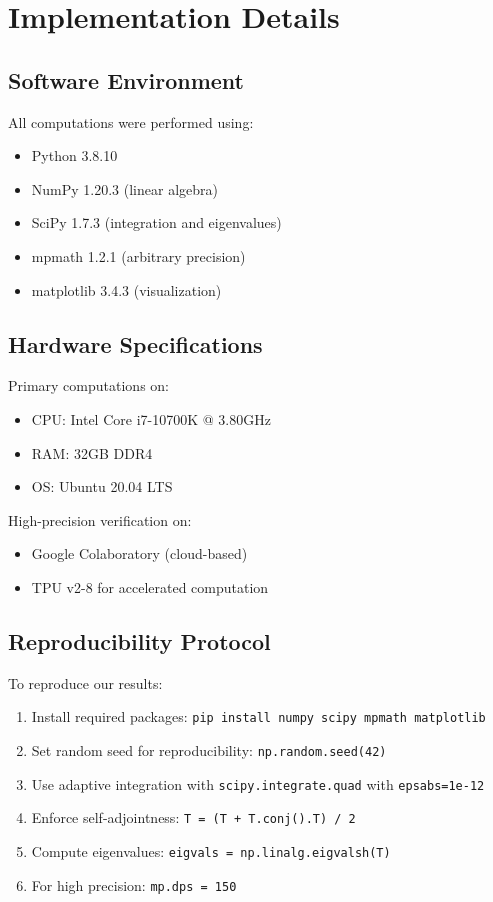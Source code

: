 \documentclass[12pt,letterpaper]{article}
\theoremstyle{plain}
\theoremstyle{definition}
\theoremstyle{remark}
\begin{document}
\section{Implementation Details}

\subsection{Software Environment}

All computations were performed using:
\begin{itemize}
\item Python 3.8.10
\item NumPy 1.20.3 (linear algebra)
\item SciPy 1.7.3 (integration and eigenvalues)
\item mpmath 1.2.1 (arbitrary precision)
\item matplotlib 3.4.3 (visualization)
\end{itemize}

\subsection{Hardware Specifications}

Primary computations on:
\begin{itemize}
\item CPU: Intel Core i7-10700K @ 3.80GHz
\item RAM: 32GB DDR4
\item OS: Ubuntu 20.04 LTS
\end{itemize}

High-precision verification on:
\begin{itemize}
\item Google Colaboratory (cloud-based)
\item TPU v2-8 for accelerated computation
\end{itemize}

\subsection{Reproducibility Protocol}

To reproduce our results:

\begin{enumerate}
\item Install required packages: \texttt{pip install numpy scipy mpmath matplotlib}
\item Set random seed for reproducibility: \texttt{np.random.seed(42)}
\item Use adaptive integration with \texttt{scipy.integrate.quad} with \texttt{epsabs=1e-12}
\item Enforce self-adjointness: \texttt{T = (T + T.conj().T) / 2}
\item Compute eigenvalues: \texttt{eigvals = np.linalg.eigvalsh(T)}
\item For high precision: \texttt{mp.dps = 150}
\end{enumerate}
\end{document}

